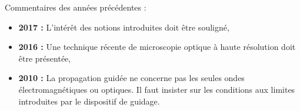 \begin{reportBlock}{Commentaires des années précédentes :}
    \begin{itemize}
        \item \textbf{2017 :} L’intérêt des notions introduites doit être souligné,
        \item \textbf{2016 :} Une technique récente de microscopie optique à haute résolution doit être présentée,
        \item \textbf{2010 :} La propagation guidée ne concerne pas les seules ondes électromagnétiques ou optiques. Il faut insister sur les conditions aux limites introduites par le dispositif de guidage.
    \end{itemize}
\end{reportBlock}

